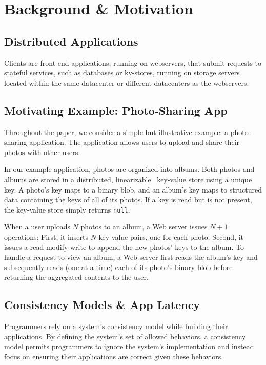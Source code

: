 \section{Background \& Motivation}

\subsection{Distributed Applications}

Clients are front-end applications, running on webservers, that submit requests to stateful services, such as databases or kv-stores, running on storage servers located within the same datacenter or different datacenters as the webservers.

\subsection{Motivating Example: Photo-Sharing App}

Throughout the paper, we consider a simple but illustrative
example: a photo-sharing application. The application allows
users to upload and share their photos with other users.

In our example application, photos are organized into
albums. Both photos and albums are stored in a distributed,
linearizable~\cite{herlihy1990linearizability} key-value store
using a unique key. A photo’s key maps to a binary blob, and
an album’s key maps to structured data containing the keys of
all of its photos. If a key is read but is not present, the
key-value store simply returns \texttt{null}.

When a user uploads $N$ photos to an album, a Web server
issues $N+1$ operations: First, it inserts $N$ key-value
pairs, one for each photo. Second, it issues a read-modify-write
to append the new photos' keys to the album. To handle a request to
view an album, a Web server first reads the album's key and subsequently
reads (one at a time) each of its photo's binary blob before
returning the aggregated contents to the user.

\subsection{Consistency Models \& App Latency}

Programmers rely on a system’s consistency model while building their applications. By defining the system’s set of allowed behaviors, a consistency model permits programmers to ignore the system’s implementation and instead focus on ensuring their applications are correct given these behaviors.

